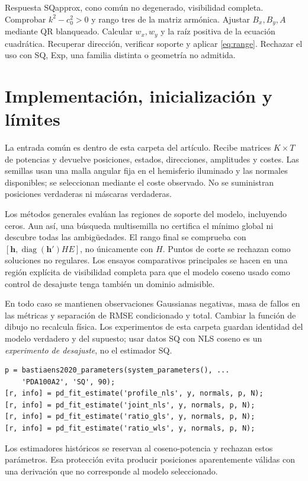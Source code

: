 \documentclass[11pt,a4paper]{article}
\begin{document}
\begin{algorithm}[htbp]\caption{LS armónico para SQapprox}\begin{algorithmic}[1]
\Require Respuesta SQapprox, cono común no degenerado, visibilidad completa.
\State Comprobar $k^2-c_0^2>0$ y rango tres de la matriz armónica.
\State Ajustar $B_x,B_y,A$ mediante QR blanqueado.
\State Calcular $w_x,w_y$ y la raíz positiva de la ecuación cuadrática.
\State Recuperar dirección, verificar soporte y aplicar \eqref{eq:range}.
\State Rechazar el uso con SQ, Exp, una familia distinta o geometría no admitida.
\end{algorithmic}\end{algorithm}

\section{Implementación, inicialización y límites}
La entrada común es  dentro de esta carpeta del artículo. Recibe matrices $K\times T$ de potencias y devuelve posiciones, estados, direcciones, amplitudes y costes. Las semillas usan una malla angular fija en el hemisferio iluminado y las normales disponibles; se seleccionan mediante el coste observado. No se suministran posiciones verdaderas ni máscaras verdaderas.

Los métodos generales evalúan las regiones de soporte del modelo, incluyendo ceros. Aun así, una búsqueda multisemilla no certifica el mínimo global ni descubre todas las ambigüedades. El rango final se comprueba con $[\mathbf h,\operatorname{diag}(\mathbf h')HE]$, no únicamente con $H$. Puntos de corte se rechazan como soluciones no regulares. Los ensayos comparativos principales se hacen en una región explícita de visibilidad completa para que el modelo coseno usado como control de desajuste tenga también un dominio admisible.

En todo caso se mantienen observaciones Gaussianas negativas, masa de fallos en las métricas y separación de RMSE condicionado y total. Cambiar la función de dibujo no recalcula física. Los experimentos de esta carpeta guardan identidad del modelo verdadero y del supuesto; usar datos SQ con NLS coseno es un \emph{experimento de desajuste}, no el estimador SQ.

\begin{verbatim}
p = bastiaens2020_parameters(system_parameters(), ...
    'PDA100A2', 'SQ', 90);
[r, info] = pd_fit_estimate('profile_nls', y, normals, p, N);
[r, info] = pd_fit_estimate('joint_nls', y, normals, p, N);
[r, info] = pd_fit_estimate('ratio_gls', y, normals, p, N);
[r, info] = pd_fit_estimate('ratio_wls', y, normals, p, N);
\end{verbatim}
Los estimadores históricos  se reservan al coseno-potencia y rechazan estos parámetros. Esa protección evita producir posiciones aparentemente válidas con una derivación que no corresponde al modelo seleccionado.



\end{document}

